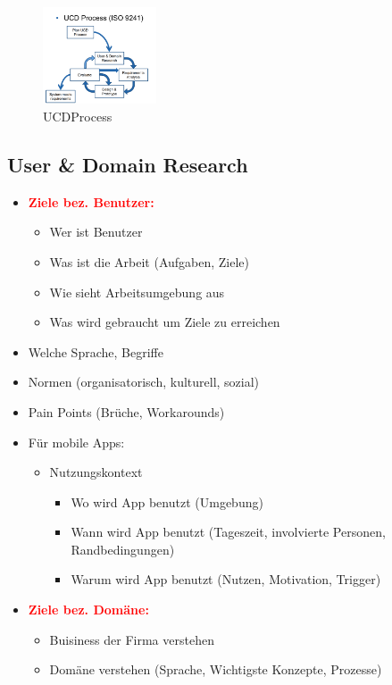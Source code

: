 \documentclass[../ZF_SWEN1.tex]{subfiles}
\begin{document}
\begin{figure}[H]
\centering
\includegraphics[width=0.3\textwidth]{Resources/Images/UCD_Process.png}
\caption{\label{fig:UCDProcess} UCDProcess}
\end{figure}

\subsection{User \& Domain Research}
\begin{itemize}
	\item \textcolor{red} {\textbf{Ziele bez. Benutzer:}}
	\begin{itemize}
		\item Wer ist Benutzer
		\item Was ist die Arbeit (Aufgaben, Ziele)
		\item Wie sieht Arbeitsumgebung aus
		\item Was wird gebraucht um Ziele zu erreichen
	\end{itemize}
	\item Welche Sprache, Begriffe
	\item Normen (organisatorisch, kulturell, sozial)
	\item Pain Points (Brüche, Workarounds)
	\item Für mobile Apps:
	\begin{itemize}
		\item Nutzungskontext
		\begin{itemize}
			\item Wo wird App benutzt (Umgebung)
			\item Wann wird App benutzt (Tageszeit, involvierte Personen, Randbedingungen)
			\item Warum wird App benutzt (Nutzen, Motivation, Trigger)
		\end{itemize}
	\end{itemize}
	\item \textcolor{red} {\textbf{Ziele bez. Domäne:}}
	\begin{itemize}
		\item Buisiness der Firma verstehen
		\item Domäne verstehen (Sprache, Wichtigste Konzepte, Prozesse)
	\end{itemize}
	
\end{itemize}
\end{document}
